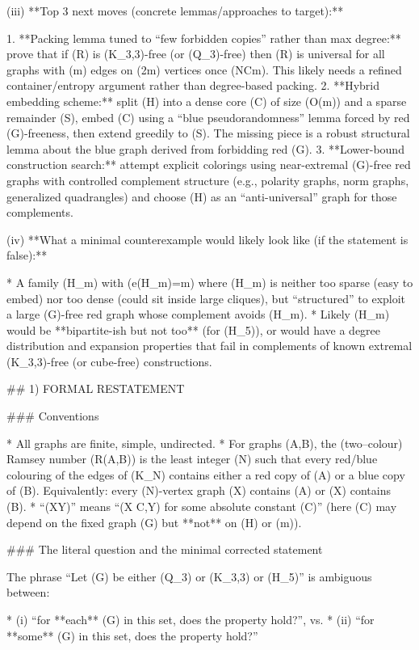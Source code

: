 (iii) **Top 3 next moves (concrete lemmas/approaches to target):**

1. **Packing lemma tuned to “few forbidden copies” rather than max degree:** prove that if (R) is (K_{3,3})-free (or (Q_3)-free) then (\overline R) is universal for all graphs with (m) edges on (\le 2m) vertices once (N\ge Cm). This likely needs a refined container/entropy argument rather than degree-based packing.
2. **Hybrid embedding scheme:** split (H) into a dense core (C) of size (O(\sqrt m)) and a sparse remainder (S), embed (C) using a “blue pseudorandomness” lemma forced by red (G)-freeness, then extend greedily to (S). The missing piece is a robust structural lemma about the blue graph derived from forbidding red (G).
3. **Lower-bound construction search:** attempt explicit colorings using near-extremal (G)-free red graphs with controlled complement structure (e.g., polarity graphs, norm graphs, generalized quadrangles) and choose (H) as an “anti-universal” graph for those complements.

(iv) **What a minimal counterexample would likely look like (if the statement is false):**

* A family (H_m) with (e(H_m)=m) where (H_m) is neither too sparse (easy to embed) nor too dense (could sit inside large cliques), but “structured” to exploit a large (G)-free red graph whose complement avoids (H_m).
* Likely (H_m) would be **bipartite-ish but not too** (for (H_5)), or would have a degree distribution and expansion properties that fail in complements of known extremal (K_{3,3})-free (or cube-free) constructions.


## 1) FORMAL RESTATEMENT

### Conventions

* All graphs are finite, simple, undirected.
* For graphs (A,B), the (two–colour) Ramsey number (R(A,B)) is the least integer (N) such that every red/blue colouring of the edges of (K_N) contains either a red copy of (A) or a blue copy of (B). Equivalently: every (N)-vertex graph (X) contains (A) or (\overline X) contains (B).
* “(X\ll Y)” means “(X \le C,Y) for some absolute constant (C)” (here (C) may depend on the fixed graph (G) but **not** on (H) or (m)).

### The literal question and the minimal corrected statement

The phrase “Let (G) be either (Q_3) or (K_{3,3}) or (H_5)” is ambiguous between:

* (i) “for **each** (G) in this set, does the property hold?”, vs.
* (ii) “for **some** (G) in this set, does the property hold?”

